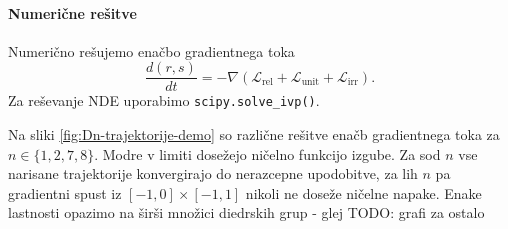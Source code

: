 \documentclass[mat2, tisk]{fmfdelo}
\newcommand{\TODO}[1]{{\color{blue} TODO: #1}}
\newcommand{\Loss}[1]{\mathcal L _\text{#1}}
\begin{document}
      \paragraph{Numerične rešitve}
      Numerično rešujemo enačbo gradientnega toka
      $$\frac{d(r,s)}{dt} = -\nabla(\Loss{rel} + \Loss{unit} +
      \Loss{irr}).$$ Za reševanje NDE uporabimo \verb|scipy.solve_ivp()|.

      Na sliki \ref{fig:Dn-trajektorije-demo} so različne rešitve
      enačb gradientnega toka za $n\in \{1,2,7,8\}$. Modre v limiti
      dosežejo ničelno funkcijo izgube. Za sod $n$ vse narisane
      trajektorije konvergirajo do nerazcepne upodobitve, za lih $n$
      pa gradientni spust iz $[-1,0]\times[-1,1]$ nikoli ne doseže
      ničelne napake. Enake lastnosti opazimo na širši množici
      diedrskih grup - glej \TODO{grafi za ostalo}
\end{document}
